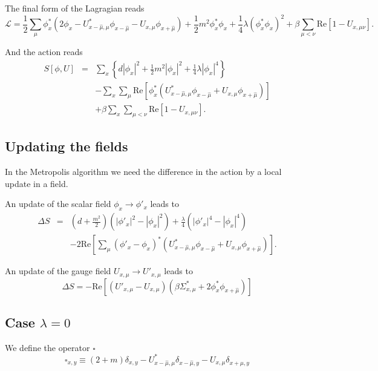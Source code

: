 \documentclass[12pt,a4paper]{article}
\begin{document}
The final form of the Lagragian reads
\begin{equation}
    \mathcal{L} = \frac{1}{2}\sum_{\mu}\phi_x^*\left( 2\phi_x - U^*_{x-\hat{\mu},\mu}\phi_{x-\hat{\mu}} - U_{x,\mu}\phi_{x+\hat{\mu}}\right) + \frac{1}{2}m^2\phi_x^*\phi_x + \frac{1}{4}\lambda\left(\phi_x^*\phi_x\right)^2 + \beta\sum_{\mu<\nu}\text{Re} \left[1 - U_{x,\mu\nu} \right].
\end{equation}

And the action reads
\begin{eqnarray}
    S[\phi,U] & = &\sum_x \left\{ d|\phi_x|^2 + \frac{1}{2}m^2|\phi_x|^2 + \frac{1}{4}\lambda |\phi_x|^4 \right\} \nonumber\\
    & & - \sum_x\sum_{\mu}\text{Re}\left[\phi_x^*\left(U^*_{x-\hat{\mu},\mu}\phi_{x-\hat{\mu}} + U_{x,\mu}\phi_{x+\hat{\mu}}\right)\right]\nonumber \\     
     & & + \beta\sum_x\sum_{\mu<\nu}\text{Re} \left[1 - U_{x,\mu\nu} \right].
\end{eqnarray}

\subsection{Updating the fields}
In the Metropolis algorithm we need the difference in the action by a local update in a field.

An update of the scalar field $\phi_x \to \phi'_x$ leads to 
\begin{eqnarray}
    \Delta S & = & \left(d +\frac{m^2}{2} \right)\left( |\phi'_x|^2 - |\phi_x|^2\right) + \frac{\lambda}{4}\left( |\phi'_x|^4 - |\phi_x|^4\right) \nonumber\\
    & &- 2\text{Re}\left[\sum_{\mu}\left(\phi'_x -\phi_x \right)^*\left(U^*_{x-\hat{\mu},\mu}\phi_{x-\hat{\mu}} + U_{x,\mu}\phi_{x+\hat{\mu}}\right) \right].
\end{eqnarray}

An update of the gauge field $U_{x,\mu} \to U'_{x,\mu}$ leads to
\begin{equation}
    \Delta S = -\text{Re} \left[ (U'_{x,\mu} - U_{x,\mu})\left(\beta\Sigma^*_{x,\mu}+2\phi^*_x \phi_{x+\hat{\mu}}\right)\right]
\end{equation}

\subsection{Case $\lambda = 0$}
We define the operator $\square$
\begin{equation}
	\square_{x,y} \equiv (2+m)\delta_{x,y} - U^*_{x-\hat{\mu},\mu}\delta_{x-\hat{\mu},y} - U_{x,\mu}\delta_{x+\hat{\mu},y}  
\end{equation}
\end{document}
